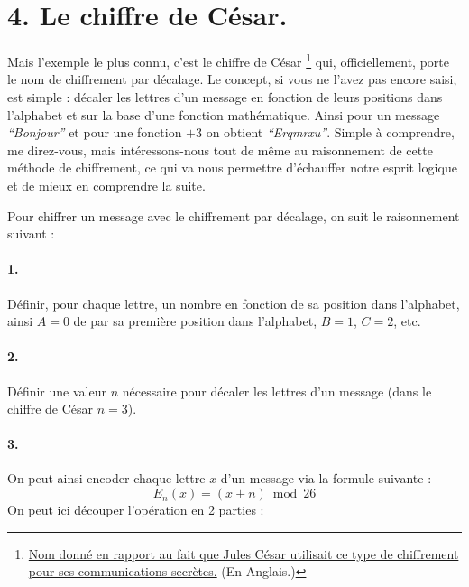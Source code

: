 \documentclass[
  paper=a4,
  ,captions=tableheading
]{scrartcl}
\begin{document}
\section{4. Le chiffre de César.}\label{le-chiffre-de-cuxe9sar.}

Mais l'exemple le plus connu, c'est le chiffre de César \footnote{\href{https://sourcebooks.fordham.edu/ancient/suetonius-julius.asp}{Nom
  donné en rapport au fait que Jules César utilisait ce type de
  chiffrement pour ses communications secrètes.} (En Anglais.)} qui,
officiellement, porte le nom de chiffrement par décalage. Le concept, si
vous ne l'avez pas encore saisi, est simple : décaler les lettres d'un
message en fonction de leurs positions dans l'alphabet et sur la base
d'une fonction mathématique. Ainsi pour un message \emph{``Bonjour''} et
pour une fonction \(+3\) on obtient \emph{``Erqmrxu''}. Simple à
comprendre, me direz-vous, mais intéressons-nous tout de même au
raisonnement de cette méthode de chiffrement, ce qui va nous permettre
d'échauffer notre esprit logique et de mieux en comprendre la suite.

Pour chiffrer un message avec le chiffrement par décalage, on suit le
raisonnement suivant : 

\paragraph{1.}\label{section}

Définir, pour chaque lettre, un
nombre en fonction de sa position dans l'alphabet, ainsi \(A = 0\) de
par sa première position dans l'alphabet, \(B = 1\), \(C = 2\), etc.

\paragraph{2.}\label{section}

Définir une valeur \(n\) nécessaire pour décaler les lettres d'un
message (dans le chiffre de César \(n=3\)).

\paragraph{3.}\label{section-1}

On peut ainsi encoder chaque lettre \(x\) d'un message via la formule
suivante : \[
E_n(x)=(x+n)\bmod26
\] On peut ici découper l'opération en 2 parties :
\end{document}
